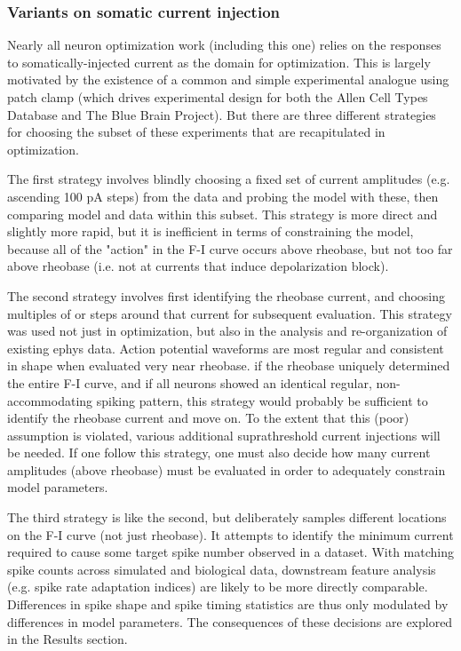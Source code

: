 \subsubsection{Variants on somatic current injection}
Nearly all neuron optimization work (including this one) relies on the responses to somatically-injected current as the domain for optimization.
This is largely motivated by the existence of a common and simple experimental analogue using patch clamp (which drives experimental design for both the Allen Cell Types Database and The Blue Brain Project).
But there are three different strategies for choosing the subset of these experiments that are recapitulated in optimization.

The first strategy involves blindly choosing a fixed set of current amplitudes (e.g. ascending 100 pA steps) from the data and probing the model with these, then comparing model and data within this subset.
This strategy is more direct and slightly more rapid, but it is inefficient in terms of constraining the model, because all of the "action" in the F-I curve occurs above rheobase, but not too far above rheobase (i.e. not at currents that induce depolarization block).

The second strategy involves first identifying the rheobase current, and choosing multiples of or steps around that current for subsequent evaluation. This strategy was used not just in optimization, but also in the analysis and re-organization of existing ephys data.
Action potential waveforms are most regular and consistent in shape when evaluated very near rheobase. 
if the rheobase uniquely determined the entire F-I curve, and if all neurons showed an identical regular, non-accommodating spiking pattern, this strategy would probably be sufficient to identify the rheobase current and move on. To the extent that this (poor) assumption is violated, various additional suprathreshold current injections will be needed. 
If one follow this strategy, one must also decide how many current amplitudes (above rheobase) must be evaluated in order to adequately constrain model parameters.

The third strategy is like the second, but deliberately samples different locations on the F-I curve (not just rheobase).
It attempts to identify the minimum current required to cause some target spike number observed in a dataset. With matching spike counts across simulated and biological data, downstream feature analysis (e.g. spike rate adaptation indices) are likely to be more directly comparable.
Differences in spike shape and spike timing statistics are thus only modulated by differences in model parameters.
The consequences of these decisions are explored in the Results section.


